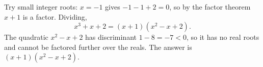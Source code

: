 Try small integer roots: $x=-1$ gives $-1-1+2=0$, so by the factor theorem $x+1$ is a factor. Dividing,
\[x^3+x+2=(x+1)\left(x^2-x+2\right).\]
The quadratic $x^2-x+2$ has discriminant $1-8=-7<0$, so it has no real roots and cannot be factored further over the reals. The answer is $\boxed{(x+1)(x^2-x+2)}$.
